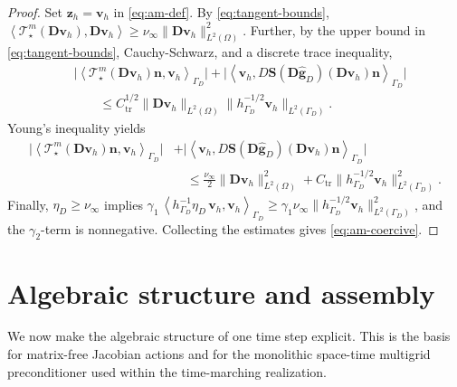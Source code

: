 \documentclass[DIV=16]{scrartcl}
\newcommand{\Ip}[2]{\left\langle #1,#2\right\rangle}
\newcommand{\uu}{\boldsymbol v}
\renewcommand{\vv}{\boldsymbol z}
\newcommand{\nn}{\boldsymbol n}
\newcommand{\DD}{\boldsymbol D} %
\newcommand{\Sstress}{\boldsymbol S} %
\newcommand{\GhD}{\Gamma_{D}}
\newcommand{\gOne}{\gamma_{1}}  %
\newcommand{\gTwo}{\gamma_{2}}  %
\newcommand{\hGD}{h_{\Gamma_D}} %
\newcommand{\DStress}[2]{D\Sstress \left(#1\right) \left(#2\right)}
\begin{document}
\begin{proof}
Set $\vv_h=\uu_h$ in \eqref{eq:am-def}.
By \eqref{eq:tangent-bounds},
$\Ip{\mathcal T_\star^m(\DD\uu_h)}{\DD\uu_h}\ge
\nu_\infty\|\DD\uu_h\|_{L^2(\Omega)}^2$.
Further, by the upper bound in \eqref{eq:tangent-bounds}, Cauchy-Schwarz, and
a discrete trace inequality,
\begin{equation*}
  \begin{split}
    &\bigl|\Ip{\mathcal T_\star^m(\DD\uu_h)\nn}{\uu_h}_{\GhD}\bigr|
    +\bigl|\Ip{\uu_h}{\DStress{\DD\hat{\boldsymbol g}_D}{\DD\uu_h}\nn}_{\GhD}\bigr|\\
    &\qquad\le
    C_{\mathrm{tr}}^{1/2}\|\DD\uu_h\|_{L^2(\Omega)}
    \|\hGD^{-1/2}\uu_h\|_{L^2(\GhD)}.
  \end{split}
\end{equation*}
Young's inequality yields
\begin{equation*}
\begin{split}
\bigl|\Ip{\mathcal T_\star^m(\DD\uu_h)\nn}{\uu_h}_{\GhD}\bigr|
&+\bigl|\Ip{\uu_h}{\DStress{\DD\hat{\boldsymbol g}_D}{\DD\uu_h}\nn}_{\GhD}\bigr|\\
&\quad\le \frac{\nu_\infty}{2}\|\DD\uu_h\|_{L^2(\Omega)}^2
   +C_{\mathrm{tr}}\|\hGD^{-1/2}\uu_h\|_{L^2(\GhD)}^2.
\end{split}
\end{equation*}
Finally, $\eta_D\ge \nu_\infty$ implies
$\gOne\,\Ip{\hGD^{-1}\eta_D\,\uu_h}{\uu_h}_{\GhD}\ge
 \gOne\nu_\infty\|\hGD^{-1/2}\uu_h\|_{L^2(\GhD)}^2$,
and the $\gTwo$-term is nonnegative.
Collecting the estimates gives \eqref{eq:am-coercive}.
\end{proof}


\section{Algebraic structure and assembly}
\label{sec:algebraic}
We now make the algebraic structure of one time step explicit.
This is the basis for matrix-free Jacobian actions and for the monolithic
space-time multigrid preconditioner used within the time-marching realization.
\end{document}
